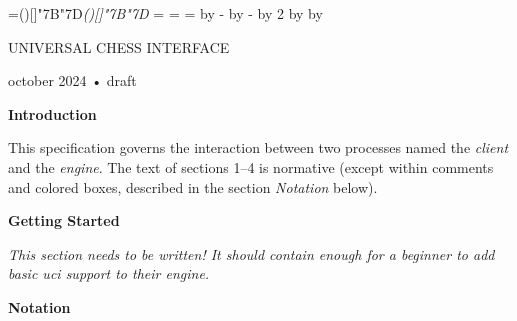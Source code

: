 \long{}%
%
\def\hex#1{{\fw\color{\r{ltgrey_fg}}{\cas x}#1}}%
\def\uni#1{{\caps u+#1}}%
%
\def\ellipsis{.\ot.\ot.}
%
\newcount\majorcount
\newcount\minorcount
\def\major{%
  \advance\majorcount by 1
  \minorcount=0
  \leavevmode
  \llap{\label{\the\majorcount}\hem}%
}%
\def\minor{%
  \advance\minorcount by 1
  \leavevmode
  \llap{\label{\the\majorcount·\the\minorcount}\hem}%
}%
\def\gets{<-}%
\def\to  {->}%
\def\then{=>}%
%
=\hbox{\fw ()[]\char"7B\char"7D\it ()[]\char"7B\char"7D}%
\newdimen\strutht
\newdimen\strutdp
\strutht=
\strutdp=
=\baselineskip
\advance{} by -\strutht
\advance{} by -\strutdp
\divide{} by 2
\advance\strutht by 
\advance\strutdp by 
\def\strut{\vrule width 0pt height \strutht depth \strutdp}%
%
\def\tab{%
  \kern 0.75ex
  \color{\r{ltgrey_fg}}{\vrule width 0.5pt}%
  \kern -0.5pt
  \kern -0.75ex
  \kern 3ex
}%
%
\def\kwd  #1{\color{\r{  blue_fg}}{#1}}%
\def\flow #1{\color{\r{ amber_fg}}{#1}}%
\def\liter#1{\color{\r{   red_fg}}{#1}}%
\def\const#1{\color{\r{ lilac_fg}}{#1}}%
\def\func #1{\color{\r{ green_fg}}{#1}}%
\def\var  #1{{\ifw #1}}%
%
\centerline{ UNIVERSAL CHESS INTERFACE}
\centerline{ october 2024 • draft}

\baselineskip

{\bf Introduction}

This specification governs the interaction between two processes named the
{\it client} and the {\it engine}.  The text of
sections 1–4 is normative (except within comments and colored boxes, described
in the section {\it Notation} below).

{\bf Getting Started}

{\it This section needs to be written! It should contain enough for a beginner
to add basic {\icap uci} support to their engine.}

\vfil\break

{\bf Notation}

